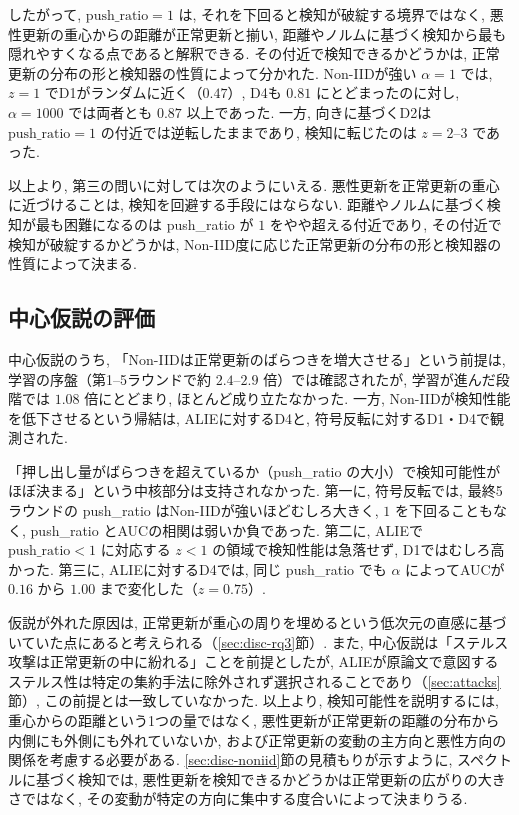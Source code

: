 \documentclass[a4j, twocolumn, dvipdfmx]{jsarticle}
\newcommand{\PushRatio}{\textrm{push\_ratio}}
\begin{document}
したがって, $\PushRatio=1$ は, それを下回ると検知が破綻する境界ではなく, 悪性更新の重心からの距離が正常更新と揃い, 距離やノルムに基づく検知から最も隠れやすくなる点であると解釈できる. その付近で検知できるかどうかは, 正常更新の分布の形と検知器の性質によって分かれた. Non-IIDが強い $\alpha=1$ では, $z=1$ でD1がランダムに近く（$0.47$）, D4も $0.81$ にとどまったのに対し, $\alpha=1000$ では両者とも $0.87$ 以上であった. 一方, 向きに基づくD2は $\PushRatio=1$ の付近では逆転したままであり, 検知に転じたのは $z=2$--$3$ であった.

以上より, 第三の問いに対しては次のようにいえる. 悪性更新を正常更新の重心に近づけることは, 検知を回避する手段にはならない. 距離やノルムに基づく検知が最も困難になるのは \PushRatio{} が $1$ をやや超える付近であり, その付近で検知が破綻するかどうかは, Non-IID度に応じた正常更新の分布の形と検知器の性質によって決まる.

\subsection{中心仮説の評価}

中心仮説のうち, 「Non-IIDは正常更新のばらつきを増大させる」という前提は, 学習の序盤（第1--5ラウンドで約 $2.4$--$2.9$ 倍）では確認されたが, 学習が進んだ段階では $1.08$ 倍にとどまり, ほとんど成り立たなかった. 一方, Non-IIDが検知性能を低下させるという帰結は, ALIEに対するD4と, 符号反転に対するD1・D4で観測された.

「押し出し量がばらつきを超えているか（\PushRatio{} の大小）で検知可能性がほぼ決まる」という中核部分は支持されなかった. 第一に, 符号反転では, 最終5ラウンドの \PushRatio{} はNon-IIDが強いほどむしろ大きく, $1$ を下回ることもなく, \PushRatio{} とAUCの相関は弱いか負であった. 第二に, ALIEで $\PushRatio<1$ に対応する $z<1$ の領域で検知性能は急落せず, D1ではむしろ高かった. 第三に, ALIEに対するD4では, 同じ \PushRatio{} でも $\alpha$ によってAUCが $0.16$ から $1.00$ まで変化した（$z=0.75$）.

仮説が外れた原因は, 正常更新が重心の周りを埋めるという低次元の直感に基づいていた点にあると考えられる（\ref{sec:disc-rq3}節）. また, 中心仮説は「ステルス攻撃は正常更新の中に紛れる」ことを前提としたが, ALIEが原論文で意図するステルス性は特定の集約手法に除外されず選択されることであり（\ref{sec:attacks}節）, この前提とは一致していなかった. 以上より, 検知可能性を説明するには, 重心からの距離という1つの量ではなく, 悪性更新が正常更新の距離の分布から内側にも外側にも外れていないか, および正常更新の変動の主方向と悪性方向の関係を考慮する必要がある. \ref{sec:disc-noniid}節の見積もりが示すように, スペクトルに基づく検知では, 悪性更新を検知できるかどうかは正常更新の広がりの大きさではなく, その変動が特定の方向に集中する度合いによって決まりうる.
\end{document}
